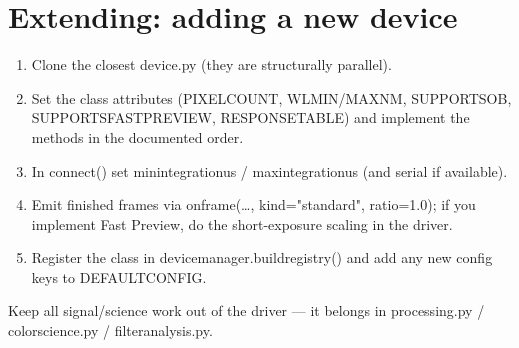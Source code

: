 \documentclass[12pt,a4paper]{article}
\DeclareRobustCommand{\code}[1]{{\ttfamily\small\def\_{\rawus\allowbreak}#1}}
\DeclareRobustCommand{\file}[1]{{\ttfamily\small\def\_{\rawus\allowbreak}#1}}
\begin{document}
\section{Extending: adding a new device}
\begin{enumerate}
  \item Clone the closest \file{\_device\_*.py} (they are structurally parallel).
  \item Set the class attributes (\code{PIXEL\_COUNT}, \code{WL\_MIN/MAX\_NM},
        \code{SUPPORTS\_OB}, \code{SUPPORTS\_FAST\_PREVIEW}, \code{RESPONSE\_TABLE})
        and implement the methods in the documented order.
  \item In \code{connect()} set \code{min\_integration\_us} /
        \code{max\_integration\_us} (and \code{serial} if available).
  \item Emit finished frames via \code{on\_frame(\dots, kind="standard", ratio=1.0)};
        if you implement Fast Preview, do the short-exposure scaling in the driver.
  \item Register the class in \code{device\_manager.build\_registry()} and add any
        new config keys to \code{DEFAULT\_CONFIG}.
\end{enumerate}
Keep all signal/science work out of the driver --- it belongs in
\file{processing.py} / \file{color\_science.py} / \file{filter\_analysis.py}.

\end{document}
